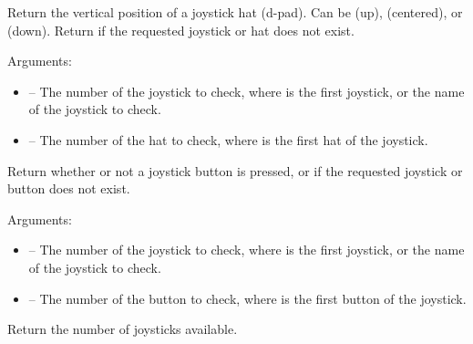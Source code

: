 \documentclass[letterpaper,10pt,english]{sphinxmanual}
\begin{document}
\begin{fulllineitems}
\label{joystick:sge.joystick.get_hat_y}
Return the vertical position of a joystick hat (d-pad).  Can be
 (up),  (centered), or  (down).  Return  if the
requested joystick or hat does not exist.

Arguments:
\begin{itemize}
\item {} 
 -- The number of the joystick to check, where 
is the first joystick, or the name of the joystick to check.

\item {} 
 -- The number of the hat to check, where  is the
first hat of the joystick.

\end{itemize}

\end{fulllineitems}


\begin{fulllineitems}
\label{joystick:sge.joystick.get_pressed}
Return whether or not a joystick button is pressed, or
 if the requested joystick or button does not exist.

Arguments:
\begin{itemize}
\item {} 
 -- The number of the joystick to check, where 
is the first joystick, or the name of the joystick to check.

\item {} 
 -- The number of the button to check, where  is
the first button of the joystick.

\end{itemize}

\end{fulllineitems}


\begin{fulllineitems}
\label{joystick:sge.joystick.get_joysticks}
Return the number of joysticks available.

\end{fulllineitems}
\end{document}
